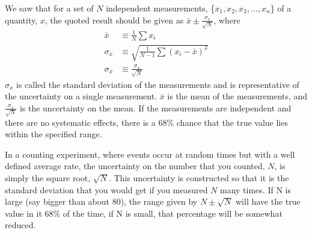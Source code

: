 \begin{chapterSummary}
We saw that for a set of $N$ independent measurements, \{$x_1, x_2, x_3, \dots, x_n$\} of a quantity, $x$, the quoted result should be given as $\bar x \pm \frac{\sigma_{x}}{\sqrt{N}}$, where
\begin{align}
\label{eqn:meanAndErrorOnMean}
\bar x &\equiv \frac{1}{N}\sum x_i \nonumber\\
\sigma_x &\equiv \sqrt{\frac{1}{N-1}\sum (x_i-\bar x)^2}\nonumber\\
\sigma_{\bar x} &\equiv \frac{\sigma_x}{\sqrt{N}}
\end{align}
$\sigma_x$ is called the standard deviation of the measurements and is representative of the uncertainty on a single measurement. $\bar x$ is the mean of the measurements, and $\frac{\sigma_x}{\sqrt{N}}$ is the uncertainty on the mean. If the measurements are independent and there are no systematic effects, there is a 68\% chance that the true value lies within the specified range.

In a counting experiment, where events occur at random times but with a well defined average rate, the uncertainty on the number that you counted, $N$, is simply the square root, $\sqrt{N}$. This uncertainty is constructed so that it is the standard deviation that you would get if you measured $N$ many times. If N is large (say bigger than about 80), the range given by $N\pm \sqrt{N}$ will have the true value in it 68\% of the time, if N is small, that percentage will be somewhat reduced.
\end{chapterSummary}